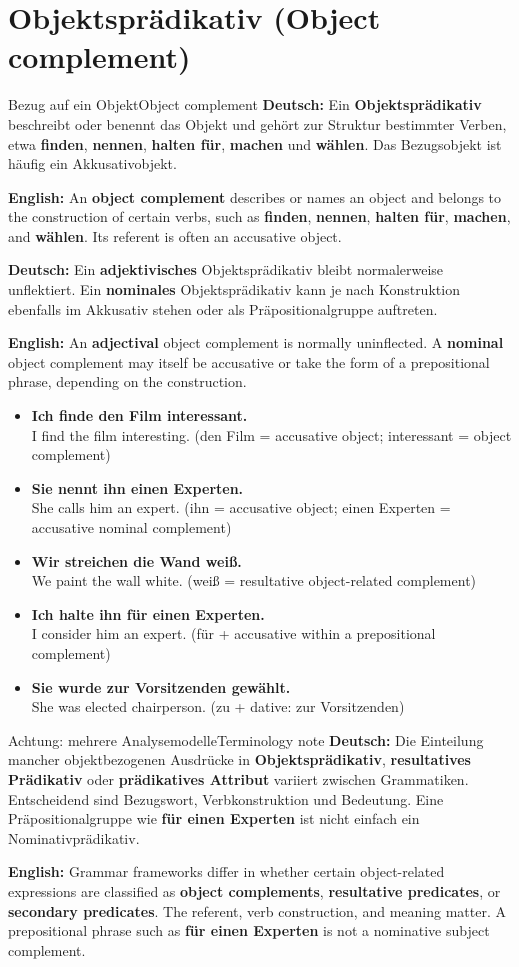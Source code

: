 \documentclass[a4paper,11pt]{article}
\newcommand{\GermanText}[1]{\textbf{Deutsch: }#1\par}
\newcommand{\EnglishText}[1]{{\small\color{SoftGray}\textbf{English: }#1\par}}
\newcommand{\ExampleItem}[2]{\item \textbf{#1}\\{\small\color{SoftGray}#2}}
\begin{document}
\section{Objektsprädikativ \textnormal{(Object complement)}}
\begin{grammarentry}{Bezug auf ein Objekt}{Object complement}
\GermanText{Ein \textbf{Objektsprädikativ} beschreibt oder benennt das Objekt und gehört zur Struktur bestimmter Verben, etwa \textbf{finden}, \textbf{nennen}, \textbf{halten für}, \textbf{machen} und \textbf{wählen}. Das Bezugsobjekt ist häufig ein Akkusativobjekt.}
\EnglishText{An \textbf{object complement} describes or names an object and belongs to the construction of certain verbs, such as \textbf{finden}, \textbf{nennen}, \textbf{halten für}, \textbf{machen}, and \textbf{wählen}. Its referent is often an accusative object.}
\GermanText{Ein \textbf{adjektivisches} Objektsprädikativ bleibt normalerweise unflektiert. Ein \textbf{nominales} Objektsprädikativ kann je nach Konstruktion ebenfalls im Akkusativ stehen oder als Präpositionalgruppe auftreten.}
\EnglishText{An \textbf{adjectival} object complement is normally uninflected. A \textbf{nominal} object complement may itself be accusative or take the form of a prepositional phrase, depending on the construction.}
\end{grammarentry}
\begin{exbox}\begin{itemize}
\ExampleItem{Ich finde den Film interessant.}{I find the film interesting. (den Film = accusative object; interessant = object complement)}
\ExampleItem{Sie nennt ihn einen Experten.}{She calls him an expert. (ihn = accusative object; einen Experten = accusative nominal complement)}
\ExampleItem{Wir streichen die Wand weiß.}{We paint the wall white. (weiß = resultative object-related complement)}
\ExampleItem{Ich halte ihn für einen Experten.}{I consider him an expert. (für + accusative within a prepositional complement)}
\ExampleItem{Sie wurde zur Vorsitzenden gewählt.}{She was elected chairperson. (zu + dative: zur Vorsitzenden)}
\end{itemize}\end{exbox}
\begin{grammarentry}{Achtung: mehrere Analysemodelle}{Terminology note}
\GermanText{Die Einteilung mancher objektbezogenen Ausdrücke in \textbf{Objektsprädikativ}, \textbf{resultatives Prädikativ} oder \textbf{prädikatives Attribut} variiert zwischen Grammatiken. Entscheidend sind Bezugswort, Verbkonstruktion und Bedeutung. Eine Präpositionalgruppe wie \textbf{für einen Experten} ist nicht einfach ein Nominativprädikativ.}
\EnglishText{Grammar frameworks differ in whether certain object-related expressions are classified as \textbf{object complements}, \textbf{resultative predicates}, or \textbf{secondary predicates}. The referent, verb construction, and meaning matter. A prepositional phrase such as \textbf{für einen Experten} is not a nominative subject complement.}
\end{grammarentry}
\end{document}
